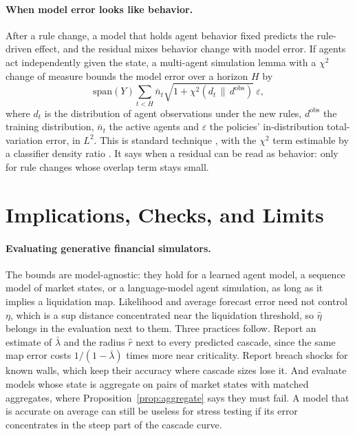 \documentclass[letterpaper]{article} %
\theoremstyle{remark}
\newcommand{\lb}{\bar\lambda}
\begin{document}
\paragraph{When model error looks like behavior.} After a rule change, a model that holds agent behavior fixed predicts the rule-driven effect, and the residual mixes behavior change with model error. If agents act independently given the state, a multi-agent simulation lemma with a $\chi^2$ change of measure bounds the model error over a horizon $H$ by
\[
\mathrm{span}(Y)\sum_{t<H}\bar n_t\sqrt{1+\chi^2(d_t\,\|\,d^{\mathrm{obs}})}\ \varepsilon,
\]
where $d_t$ is the distribution of agent observations under the new rules, $d^{\mathrm{obs}}$ the training distribution, $\bar n_t$ the active agents and $\varepsilon$ the policies' in-distribution total-variation error, in $L^2$. This is standard technique \citep{kearns2002nearoptimal,ross2011reduction,metelli2018pois}, with the $\chi^2$ term estimable by a classifier density ratio \citep{bickel2009covariate}. It says when a residual can be read as behavior: only for rule changes whose overlap term stays small.

\section{Implications, Checks, and Limits}

\paragraph{Evaluating generative financial simulators.} The bounds are model-agnostic: they hold for a learned agent model, a sequence model of market states, or a language-model agent simulation, as long as it implies a liquidation map. Likelihood and average forecast error need not control $\eta$, which is a sup distance concentrated near the liquidation threshold, so $\hat\eta$ belongs in the evaluation next to them. Three practices follow. Report an estimate of $\lb$ and the radius $\hat r$ next to every predicted cascade, since the same map error costs $1/(1-\lb)$ times more near criticality. Report breach shocks for known walls, which keep their accuracy where cascade sizes lose it. And evaluate models whose state is aggregate on pairs of market states with matched aggregates, where Proposition~\ref{prop:aggregate} says they must fail. A model that is accurate on average can still be useless for stress testing if its error concentrates in the steep part of the cascade curve.
\end{document}
